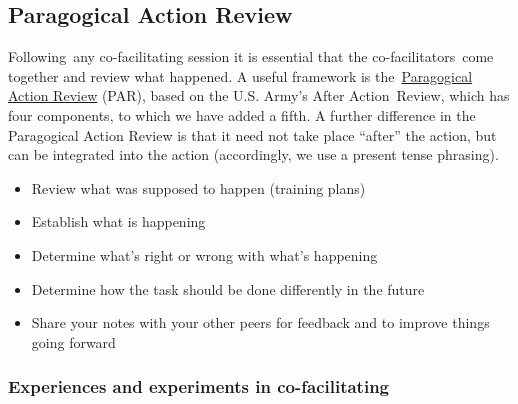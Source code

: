 \subsection{Paragogical Action Review}

Following~any co-facilitating session it is essential that the
co-facilitators~come together and review what happened. A useful
framework is
the~\href{http://www.africom.mil/WO-NCO/DownloadCenter/\%5C40Publications/Training\%20the\%20Force\%20Manual.pdf}{Paragogical
Action Review} (PAR), based on the U.S. Army's After Action~Review,
which has four components, to which we have added a fifth. A further
difference in the Paragogical Action Review is that it need not take
place ``after'' the action, but can be integrated into the action
(accordingly, we use a present tense phrasing).

\begin{itemize}
\item
  Review what was supposed to happen (training plans)
\item
  Establish what is happening
\item
  Determine what's right or wrong with what's happening
\item
  Determine how the task should be done differently in the future
\item
  Share your notes with your other peers for feedback and to improve
  things going forward
\end{itemize}

\subsubsection{Experiences and experiments in co-facilitating}

